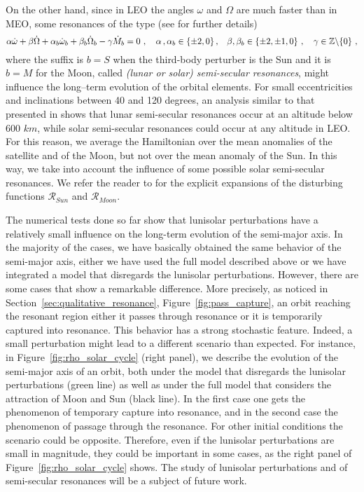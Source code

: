 \documentclass[12pt,reqno]{amsart}
\numberwithin{equation}{section}
\begin{document}
On the other hand, since in LEO the angles $\omega$ and $\Omega$ are much faster than in MEO, some resonances of the type (see
\cite{CEGGP2016} for further details)
$$
\alpha \dot\omega+ \beta \dot\Omega +\alpha_b \dot\omega_b+ \beta_b \dot\Omega_b-\gamma \dot{M}_b=0\ , \quad \alpha\,, \alpha_b \in \{\pm 2, 0\}\,,
 \hspace{0.3cm} \beta, \beta_b \in \{\pm 2, \pm 1, 0\}\ , \quad \gamma \in \mathbb{Z}\backslash\{0\}\ ,
$$
where the suffix is $b = S$  when the third-body perturber is the Sun and  it is $b = M$ for the Moon, called {\it (lunar or solar) semi-secular resonances}, might influence the long--term
evolution of the orbital elements. For small eccentricities and inclinations between 40 and 120 degrees, an analysis similar to that presented in
\cite{CEGGP2016} shows that lunar semi-secular resonances occur at an altitude below 600 $km$, while solar semi-secular resonances could occur at any altitude in LEO. For this reason, we average the Hamiltonian over the mean anomalies of the satellite and of the Moon, but  not over the mean anomaly of the Sun. In this way, we take into account the influence of some possible solar semi-secular resonances. We refer the reader to
\cite{CGPR2016} for the explicit expansions of the disturbing functions $\mathcal{R}_{Sun}$ and $\mathcal{R}_{Moon}$.


The numerical tests done so far show that lunisolar perturbations have a relatively small influence on the long-term evolution of
the semi-major axis. In the majority of the cases, we have  basically obtained the same behavior of the semi-major axis, either we have used the full model described above or we  have integrated a model that disregards the lunisolar perturbations.
However, there are some cases that show a remarkable difference. More precisely, as noticed in Section~\ref{sec:qualitative_resonance}, Figure~\ref{fig:pass_capture}, an orbit reaching the resonant region either it passes through resonance or it is
temporarily captured into resonance. This behavior has a strong stochastic feature.
Indeed, a small perturbation might lead to a different scenario than expected. For instance, in Figure~\ref{fig:rho_solar_cycle} (right panel), we describe the evolution of
the semi-major axis of an orbit, both under the model that disregards the lunisolar perturbations (green line) as well as under the full model that considers the attraction of Moon and Sun (black line). In the first case one gets the phenomenon of temporary capture into resonance, and in the second case the phenomenon of passage through the resonance. For other initial conditions the scenario could be opposite.
Therefore, even if the lunisolar perturbations are small in magnitude, they could be important in some cases, as the right panel of Figure~\ref{fig:rho_solar_cycle} shows. The study of lunisolar perturbations and of semi-secular resonances will be a subject of future work.
\end{document}
